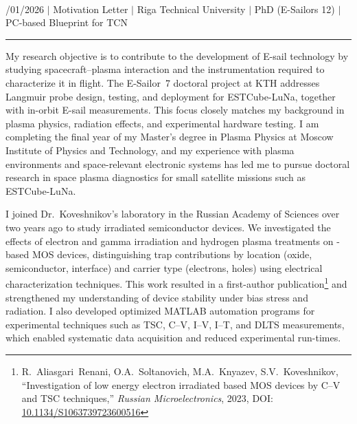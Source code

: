 \documentclass[a4paper,12pt]{article}
\begin{document}
{\centering
  {\scshape {}} \\ 
  {\fontsize{10}{10}/01/2026} $|$
  {\fontsize{10}{10}\selectfont Motivation Letter} $|$
  {\fontsize{10}{10}\selectfont Riga Technical University} $|$
  {\fontsize{10}{10}\selectfont PhD (E-Sailors 12)} $|$
  {\fontsize{10}{10}\selectfont PC-based Blueprint for TCN}
\par}
\vspace{-15pt}
\noindent\rule{\textwidth}{0.5pt}

\vspace{-5pt}

My research objective is to contribute to the development of E-sail technology by studying spacecraft--plasma interaction and the instrumentation required to characterize it in flight. The E-Sailor~7 doctoral project at KTH addresses Langmuir probe design, testing, and deployment for ESTCube-LuNa, together with in-orbit E-sail measurements. This focus closely matches my background in plasma physics, radiation effects, and experimental hardware testing. I am completing the final year of my Master's degree in Plasma Physics at Moscow Institute of Physics and Technology, and my experience with plasma environments and space-relevant electronic systems has led me to pursue doctoral research in space plasma diagnostics for small satellite missions such as ESTCube-LuNa.

I joined Dr.\ Koveshnikov's laboratory in the Russian Academy of Sciences over two years ago to study irradiated semiconductor devices. We investigated the effects of electron and gamma irradiation and hydrogen plasma treatments on -based MOS devices, distinguishing trap contributions by location (oxide, semiconductor, interface) and carrier type (electrons, holes) using electrical characterization techniques. This work resulted in a first-author publication\footnote{R.~Aliasgari~Renani, O.A.~Soltanovich, M.A.~Knyazev, S.V.~Koveshnikov, ``Investigation of low energy electron irradiated  based MOS devices by C--V and TSC techniques,'' \textit{Russian Microelectronics}, 2023, DOI: \href{https://doi.org/10.1134/S1063739723600516}{10.1134/S1063739723600516}} and strengthened my understanding of device stability under bias stress and radiation. I also developed optimized MATLAB automation programs for experimental techniques such as TSC, C--V, I--V, I--T, and DLTS measurements, which enabled systematic data acquisition and reduced experimental run-times.
\end{document}
